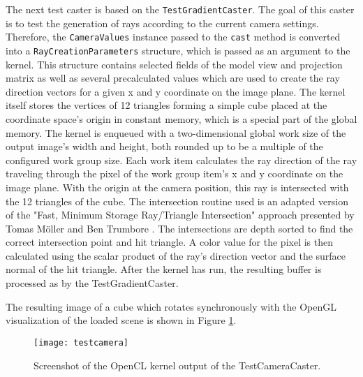 The next test caster is based on the \lstinline!TestGradientCaster!. The goal of this caster is to test the generation of rays according to the current camera settings. Therefore, the \lstinline!CameraValues! instance passed to the \lstinline!cast! method is converted into a \lstinline!RayCreationParameters! structure, which is passed as an argument to the kernel. This structure contains selected fields of the model view and projection matrix as well as several precalculated values which are used to create the ray direction vectors for a given x and y coordinate on the image plane. The kernel itself stores the vertices of 12 triangles forming a simple cube placed at the coordinate space's origin in constant memory, which is a special part of the global memory. The kernel is enqueued with a two-dimensional global work size of the output image's width and height, both rounded up to be a multiple of the configured work group size. Each work item calculates the ray direction of the ray traveling through the pixel of the work group item's x and y coordinate on the image plane. With the origin at the camera position, this ray is intersected with the 12 triangles of the cube. The intersection routine used is an adapted version of the "Fast, Minimum Storage Ray/Triangle Intersection" approach presented by Tomas Möller and Ben Trumbore \cite{triangle_intersection}. The intersections are depth sorted to find the correct intersection point and hit triangle. A color value for the pixel is then calculated using the scalar product of the ray's direction vector and the surface normal of the hit triangle. After the kernel has run, the resulting buffer is processed as by the TestGradientCaster.

%

%

The resulting image of a cube which rotates synchronously with the OpenGL visualization of the loaded scene is shown in Figure \ref{fig:testcamera}.

\begin{figure}
\centering
\texttt{[image: testcamera]}
\caption{Screenshot of the OpenCL kernel output of the TestCameraCaster.}
\label{fig:testcamera}
\end{figure}


